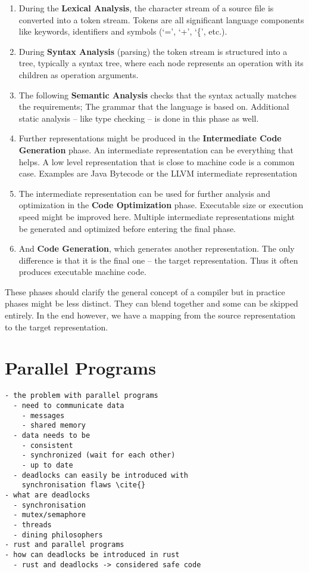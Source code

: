 \begin{enumerate}
  \item During the \textbf{Lexical Analysis}, the character stream of a source file is converted into a token stream.
  Tokens are all significant language components like keywords, identifiers and symbols (`=', `+', `\{', etc.).
  \item During \textbf{Syntax Analysis} (parsing) the token stream is structured into a tree,
  typically a syntax tree, where each node represents an operation with its children as operation arguments.
  \item The following \textbf{Semantic Analysis} checks that the syntax actually matches the requirements;
  The grammar that the language is based on.\newline
  Additional static analysis -- like type checking -- is done in this phase as well.
  \item Further representations might be produced in the \textbf{Intermediate Code Generation} phase.
  An intermediate representation can be everything that helps.
  A low level representation that is close to machine code is a common case.
  Examples are Java Bytecode or the LLVM intermediate representation
  \item The intermediate representation can be used for further analysis and optimization in the \textbf{Code Optimization} phase.
  Executable size or execution speed might be improved here.
  Multiple intermediate representations might be generated and optimized before entering the final phase.
  \item And \textbf{Code Generation}, which generates another representation.
  The only difference is that it is the final one -- the target representation.
  Thus it often produces executable machine code.
\end{enumerate}

These phases should clarify the general concept of a compiler but in practice phases might be less distinct.
They can blend together and some can be skipped entirely.
In the end however, we have a mapping from the source representation to the target representation.

\section{Parallel Programs}
\label{rel_para}
\begin{verbatim}
- the problem with parallel programs
  - need to communicate data
    - messages
    - shared memory
  - data needs to be 
    - consistent 
    - synchronized (wait for each other)
    - up to date
  - deadlocks can easily be introduced with 
    synchronisation flaws \cite{}
- what are deadlocks
  - synchronisation
  - mutex/semaphore
  - threads
  - dining philosophers
- rust and parallel programs
- how can deadlocks be introduced in rust
  - rust and deadlocks -> considered safe code
\end{verbatim}

